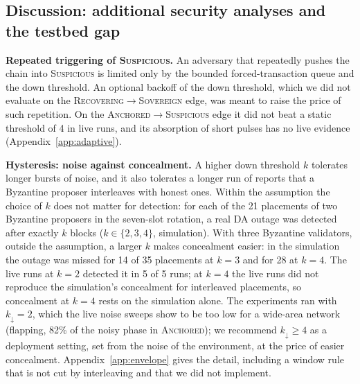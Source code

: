 \subsection*{Discussion: additional security analyses and the testbed gap}

\textbf{Repeated triggering of \textsc{Suspicious}.} An adversary that repeatedly
pushes the chain into \textsc{Suspicious} is limited only by the bounded
forced-transaction queue and the down threshold. An optional backoff of the down
threshold, which we did not evaluate on the \textsc{Recovering}$\to$\textsc{Sovereign}
edge, was meant to raise the price of such repetition. On the
\textsc{Anchored}$\to$\textsc{Suspicious} edge it did not beat a static threshold of 4
in live runs, and its absorption of short pulses has no live evidence
(Appendix~\ref{app:adaptive}).


\textbf{Hysteresis: noise against concealment.} A higher down threshold $k$
tolerates longer bursts of noise, and it also tolerates a longer run of reports
that a Byzantine proposer interleaves with honest ones. Within the assumption the
choice of $k$ does not matter for detection: for each of the 21 placements of two
Byzantine proposers in the seven-slot rotation, a real DA outage was detected after
exactly $k$ blocks ($k\in\{2,3,4\}$, simulation). With three Byzantine validators,
outside the assumption, a larger $k$ makes concealment easier: in the simulation
the outage was missed for 14 of 35 placements at $k{=}3$ and for 28 at $k{=}4$. The
live runs at $k{=}2$ detected it in 5 of 5 runs; at $k{=}4$ the live runs did not
reproduce the simulation's concealment for interleaved placements, so concealment
at $k{=}4$ rests on the simulation alone. The experiments ran with
$k_{\downarrow}{=}2$, which the live noise sweeps show to be too low for a
wide-area network (flapping, 82\% of the noisy phase in \textsc{Anchored}); we
recommend $k_{\downarrow} \geq 4$ as a deployment setting, set from the noise of
the environment, at the price of easier concealment. Appendix~\ref{app:envelope}
gives the detail, including a window rule that is not cut by interleaving and that
we did not implement.


